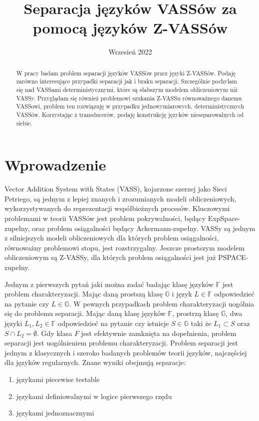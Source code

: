 \documentclass[magisterska]{pracamgr}
\title{Separacja języków VASSów za pomocą języków Z-VASSów}
\date{Wrzesień 2022}
\begin{document}
    \maketitle

    \begin{abstract}
        W pracy badam problem separacji języków VASSów przez języki Z-VASSów.
        Podaję zarówno interesujące przypadki separacji jak i braku separacji.
        Szczególnie pochylam się nad VASSami deterministycznymi, które są słabszym modelem obliczeniowym niż VASSy.
        Przyglądam się również problemowi szukania Z-VASSu równoważnego danemu VASSowi, problem ten rozwiązuję w przypadku
        jednowymiarowych, deterministycznych VASSów.
        Korzystając z transducerów, podaję konstrukcję języków nieseparowalnych od siebie.
    \end{abstract}

    \tableofcontents

    \chapter*{Wprowadzenie}

    Vector Addition System with States (VASS), kojarzone szerzej jako Sieci Petriego, są jednym z lepiej znanych i zrozumianych modeli
    obliczeniowych, wykorzystywanych do reprezentacji współbieżnych procesów.
    Kluczowymi problemami w teorii VASSów jest problem pokrywalności, będący ExpSpace-zupełny, oraz problem
    osiągalności będący Ackermann-zupełny\cite{Ackermann-complete}.
    VASSy są jednym z silniejszych modeli obliczeniowych dla których problem osiągalności, równoważny problemowi stopu, jest rozstrzygalny.
    Jeszcze prostszym modelem obliczeniowym są Z-VASSy, dla których problem osiągalności jest już PSPACE-zupełny.


    Jednym z pierwszych pytań jaki można zadać badając klasę języków $\mathbb{F}$ jest problem charakteryzacji.
    Mając daną prostszą klasę $\mathbb{G}$ i język $L\in \mathbb{F}$ odpowiedzieć na pytanie czy $L \in \mathbb{G}$.
    W pewnych przypadkach problem charakteryzacji uogólnia się do problemu separacji.
    Mając daną klasę języków $\mathbb{F}$, prostrzą klasę $\mathbb{G}$, dwa języki $L_1,L_2 \in \mathbb{F}$ odpowiedzieć na
    pytanie czy istnieje $S \in \mathbb{G}$ taki że $L_1 \subset S$ oraz $S \cap L_2 = \emptyset$.
    Gdy klasa $F$ jest efektywnie zamknięta na dopełnienia, problem separacji jest uogólnieniem problemu charakteryzacji.
    Problem separacji jest jednym z klasycznych i szeroko badanych problemów teorii języków, najczęściej dla języków regularnych.
    Znane wyniki obejmują separacje:
    \begin{enumerate}
        \item  językami piecewise testable\cite{piecewise-testable,piecewise-testable2}
        \item językami definiowalnymi w logice pierwszego rzędu\cite{FO-languages}
        \item  językami jednoznacznymi\cite{piecewise-testable2}
    \end{enumerate}
\end{document}
